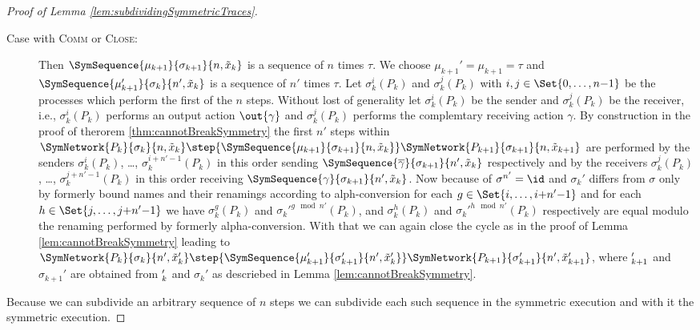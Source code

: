 \documentclass[11pt,techReport]{eptcs}
\begin{document}
\begin{proof}[Proof of Lemma \ref{lem:subdividingSymmetricTraces}]
\begin{description}
		\item[Case with \textsc{Comm} or \textsc{Close}:] Then $ \SymSequence{\mu_{k{+}1}}{\sigma_{k{+}1}}{n, \tilde{x}_k} $ is a sequence of $ n $ times $ \tau $. We choose $ \mu_{k{+}1}' = \mu_{k{+}1} = \tau $ and $ \SymSequence{\mu_{k{+}1}'}{\sigma_k}{n', \tilde{x}_k} $ is a sequence of $ n' $ times $ \tau $. Let $ \sigma_k^i\left( P_k \right) $ and $ \sigma_k^j\left( P_k \right) $ with $ i, j \in \Set{ 0, \ldots, n{-}1} $ be the processes which perform the first of the $ n $ steps. Without lost of generality let $ \sigma_k^i\left( P_k \right) $ be the sender and $ \sigma_k^j\left( P_k \right) $ be the receiver, i.e., $ \sigma_k^i\left( P_k \right) $ performs an output action $ \out{\gamma} $ and $ \sigma_k^j\left( P_k \right) $ performs the complemtary receiving action $ \gamma $. By construction in the proof of therorem \ref{thm:cannotBreakSymmetry} the first $ n' $ steps within $ \SymNetwork{P_k}{\sigma_k}{n, \tilde{x}_k} \step{\SymSequence{\mu_{k{+}1}}{\sigma_{k{+}1}}{n, \tilde{x}_k}} \SymNetwork{P_{k{+}1}}{\sigma_{k{+}1}}{n, \tilde{x}_{k{+}1}} $ are performed by the senders $ \sigma_k^i\left( P_k \right) $, \ldots, $ \sigma_k^{i{+}n'{-}1}\left( P_k \right) $ in this order sending $ \SymSequence{\overline{\gamma}}{\sigma_{k{+}1}}{n', \tilde{x}_k} $ respectively and by the receivers $ \sigma_k^j\left( P_k \right) $, \ldots, $ \sigma_k^{j{+}n'{-}1}\left( P_k \right) $ in this order receiving $ \SymSequence{\gamma}{\sigma_{k{+}1}}{n', \tilde{x}_k} $. Now because of $ \sigma^{n'} = \id $ and $ \sigma_k' $ differs from $ \sigma $ only by formerly bound names and their renamings according to alph-conversion for each $ g \in \Set{ i, \ldots, i{+}n'{-}1 } $ and for each \linebreak $ h \in \Set{ j, \ldots, j{+}n'{-}1 } $ we have $ \sigma_k^g\left( P_k \right) $ and $ {\sigma_k'}^{g \!\!\! \mod n'}\left( P_k \right) $, and $ \sigma_k^h\left( P_k \right) $ and $ {\sigma_k'}^{h \!\!\! \mod n'}\left( P_k \right) $ respectively are equal modulo the renaming performed by formerly alpha-conversion. With that we can again close the cycle as in the proof of Lemma \ref{lem:cannotBreakSymmetry} leading to $ \SymNetwork{P_k}{\sigma_k}{n', \tilde{x}_k'} \step{\SymSequence{\mu_{k{+}1}'}{\sigma_{k{+}1}'}{n', \tilde{x}_k'}} \SymNetwork{P_{k{+}1}}{\sigma_{k{+}1}'}{n', \tilde{x}_{k{+}1}'} $, where $ \title{x}_{k{+}1}' $ and $ \sigma_{k{+}1}' $ are obtained from $ \title{x}_k' $ and $ \sigma_k' $ as descriebed in Lemma \ref{lem:cannotBreakSymmetry}.
	\end{description}
	Because we can subdivide an arbitrary sequence of $ n $ steps we can subdivide each such sequence in the symmetric execution and with it the symmetric execution.
\end{proof}
\end{document}
